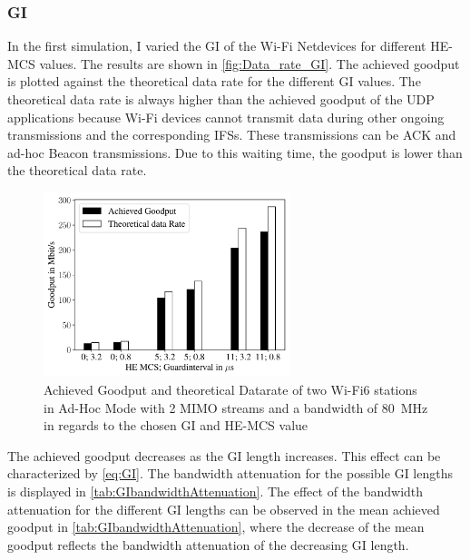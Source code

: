 \subsubsection*{\acf{GI}}

In the first simulation, I varied the \ac{GI} of the Wi-Fi Netdevices for different \ac{HE}-\ac{MCS} values.
The results are shown in \autoref{fig:Data_rate_GI}.
The achieved goodput is plotted against the theoretical data rate for the different \ac{GI} values.
The theoretical data rate is always higher than the achieved goodput of the \ac{UDP} applications because Wi-Fi devices
cannot transmit data during other ongoing transmissions and the corresponding \acp{IFS}.
These transmissions can be \ac{ACK} and ad-hoc Beacon transmissions.
Due to this waiting time, the goodput is lower than the theoretical data rate.
\begin{figure}[H]
   \centering
   \includegraphics[width=0.64\textwidth]{figures/gi_dataRate_simulation.pdf}
   \caption{Achieved Goodput and theoretical Datarate of two Wi-Fi6 stations in Ad-Hoc Mode
   with \num{2} \acf{MIMO} streams and a bandwidth of \SI{80}{\mega\hertz} in regards to the chosen \acf{GI} and \ac{HE}-\ac{MCS} value}%
   \label{fig:Data_rate_GI}%
\end{figure}

The achieved goodput decreases as the \ac{GI} length increases.
This effect can be characterized by \autoref{eq:GI}.
The bandwidth attenuation for the possible \ac{GI} lengths is displayed in \autoref{tab:GIbandwidthAttenuation}.
The effect of the bandwidth attenuation for the different \ac{GI} lengths can be observed in the mean achieved goodput in
\autoref{tab:GIbandwidthAttenuation}, where the decrease of the mean goodput reflects the bandwidth attenuation of the decreasing \ac{GI} length.

